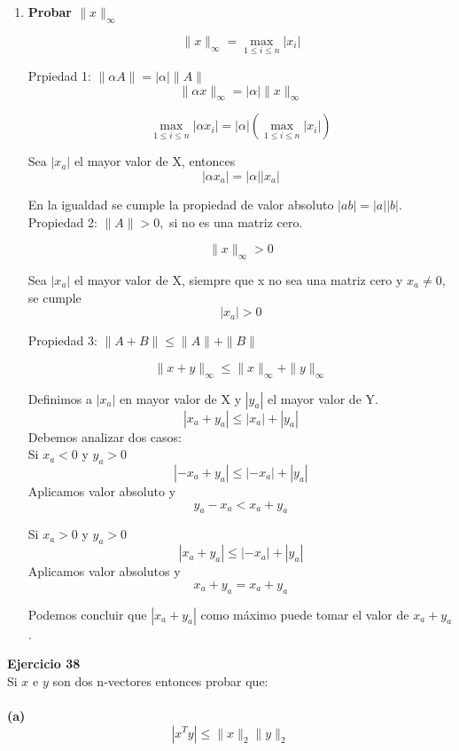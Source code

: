 \documentclass[12pt]{article}
\begin{document}
\begin{enumerate}
        
        \item \textbf{Probar $\|x\|_{\infty}$}
        
          \[\|x\|_{\infty} = \max_{1 \leq i \leq n} |x_{i}| \]
          
          Prpiedad 1: $\|\alpha A\| = |\alpha| \|A\|$
          \[ \|\alpha x\|_{\infty} = |\alpha| \|x\|_{\infty} \]
          
          \[ \max_{1 \leq i \leq n} |\alpha x_{i}| = |\alpha|(  \max_{1 \leq i \leq n} |x_{i}|) \]
          
          Sea $|x_{a}|$ el mayor valor de X, entonces
          \[ |\alpha x_{a}| = |\alpha||x_{a}| \]
          
          En la igualdad se cumple la propiedad de valor absoluto $|ab|=|a||b|$.\\
          
          Propiedad 2: $\|A\| > 0 ,$ si no es una matriz cero.
          
          \[\|x\|_{\infty} > 0\]
          
          Sea $|x_{a}|$ el mayor valor de X, siempre que x no sea una matriz cero y $x_{a} \ne 0$, se cumple 
          \[ |x_{a}| > 0  \]
          
          Propiedad 3: $\|A + B\| \leq \|A\| +  \|B\|$
          
           \[ \|x + y\|_{\infty} \leq \|x\|_{\infty} +  \|y\|_{\infty} \]
           
           Definimos a $|x_{a}|$ en mayor valor de X y $|y_{a}|$ el mayor valor de Y.
           \[ |x_{a} + y_{a}| \leq |x_{a}| +  |y_{a}| \]
           Debemos analizar dos casos:\\
           Si $x_{a} < 0$ y $y_{a} > 0$
          \[ |-x_{a} + y_{a}| \leq |-x_{a}| +  |y_{a}| \]
          Aplicamos valor absoluto y
          \[ y_{a} - x_{a} < x_{a} +  y_{a} \]
          
          Si $x_{a} > 0$ y $y_{a} > 0$
          \[ |x_{a} + y_{a}| \leq |-x_{a}| +  |y_{a}| \]
          Aplicamos valor absolutos y
          \[ x_{a} + y_{a} = x_{a} +  y_{a} \]
          
          Podemos concluir que $|x_{a} + y_{a}|$  como máximo puede tomar el valor de $x_{a} + y_{a}$.\\
          
  \end{enumerate}

\noindent \textbf{Ejercicio 38}\\
Si $x$ e $y$ son dos n-vectores entonces probar que:\\\\
\textbf{(a)}
\[
    |x^{T}y| \leq \|x\|_2\|y\|_2 
\]
\end{document}
